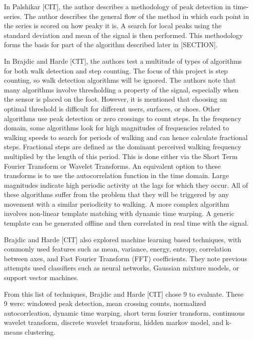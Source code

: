                 In Palshikar [CIT], the author describes a methodology of peak detection in time-series. The author describes the general flow of the method in which each point in the series is scored on how peaky it is. A search for local peaks using the standard deviation and mean of the signal is then performed. This methodology forms the basis for part of the algorithm described later in [SECTION].

                In Brajdic and Harde [CIT], the authors test a multitude of types of algorithms for both walk detection and step counting. The focus of this project is step counting, so walk detection algorithms will be ignored. The authors note that many algorithms involve thresholding a property of the signal, especially when the sensor is placed on the foot. However, it is mentioned that choosing an optimal threshold is difficult for different users, surfaces, or shoes. Other algorithms use peak detection or zero crossings to count steps. In the frequency domain, some algorithms look for high magnitudes of frequencies related to walking speeds to search for periods of walking and can hence calculate fractional steps. Fractional steps are defined as the dominant perceived walking frequency multiplied by the length of this period. This is done either via the Short Term Fourier Transform or Wavelet Transforms. An equivalent option to these transforms is to use the autocorrelation function in the time domain. Large magnitudes indicate high periodic activity at the lags for which they occur. All of these algorithms suffer from the problem that they will be triggered by any movement with a similar periodicity to walking. A more complex algorithm involves non-linear template matching with dynamic time warping. A generic template can be generated offline and then correlated in real time with the signal. 

                Brajdic and Harde [CIT] also explored machine learning based techniques, with commonly used features such as mean, variance, energy, entropy, correlation between axes, and Fast Fourier Transform (FFT) coefficients. They note previous attempts used classifiers such as neural networks, Gaussian mixture models, or support vector machines.

                From this list of techniques, Brajdic and Harde [CIT] chose 9 to evaluate. These 9 were: windowed peak detection, mean crossing counts, normalized autocorrleation, dynamic time warping, short term fourier transform, continuous wavelet transform, discrete wavelet transform, hidden markov model, and k-means clustering. 

